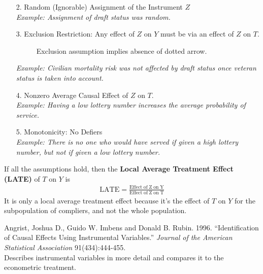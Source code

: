 \documentclass[handout]{beamer}
\begin{document}
\begin{frame}
\begin{itemize}
\item [2.] Random (Ignorable) Assignment of the Instrument $Z$ \\
\pause
\tiny
{\it Example: Assignment of draft status was random.}
\normalsize
\bigskip
\pause
\item [3.] Exclusion Restriction: \pause Any effect of $Z$ on $Y$ must
be via an effect of $Z$ on $T$.
\pause
\small
\begin{figure}[!htp]
\caption{Exclusion assumption implies absence of dotted arrow.}
\centerline{
}
\end{figure}
\pause
\tiny
{\it Example: Civilian mortality risk was not affected by draft status once
veteran status is taken into account.}
\normalsize
\bigskip
\item [4.] Nonzero Average Causal Effect of $Z$ on $T$.\\
\pause
\tiny
{\it Example:  Having a low lottery number increases the average probability of service.}
\normalsize
\bigskip
\pause
\item [5.] Monotonicity: \pause No Defiers\\
\pause
\tiny
{\it Example: There is no one who would have served if given a high lottery number, but not if given a low lottery number.}
\normalsize
\end{itemize}
\end{frame}

\begin{frame}
If all the assumptions hold, then the {\bf Local Average Treatment
Effect (LATE)} of $T$ on $Y$ is 
\begin{eqnarray*}
\mathrm{LATE} = \frac{\mathrm{Effect \; of \; Z \; on \;
Y}}{\mathrm{Effect \; of \; Z \; on \; T}} 
\end{eqnarray*}
\pause
It is only a local average treatment effect because it's the effect of
$T$ on $Y$ for the subpopulation of compliers, and not the whole population.
\end{frame}

\begin{frame}
Angrist, Joshua D., Guido W. Imbens and Donald B. Rubin. 1996. ``Identification of Causal Effects
Using Instrumental Variables.'' {\it Journal of the American
Statistical Association} 91(434):444-455. \\
\bigskip
Describes instrumental variables in more detail and compares it to the
econometric treatment.
\end{frame}
\end{document}

